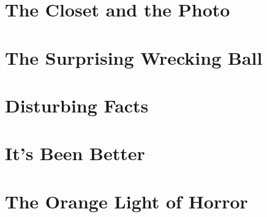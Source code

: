\documentclass[smalldemyvopaper,11pt,twoside,onecolumn,openright,extrafontsizes]{memoir}
\begin{document}
\chapter{The Closet and the Photo}

\chapter{The Surprising Wrecking Ball}

\chapter{Disturbing Facts}

\chapter{It's Been Better}

\chapter{The Orange Light of Horror}




\end{document}
